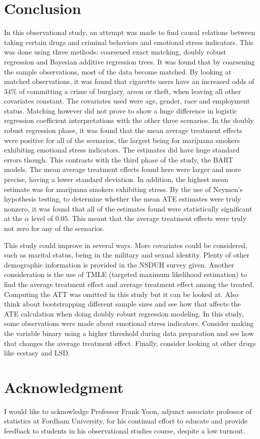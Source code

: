 \documentclass[a4paper, 10pt, conference]{ieeeconf}
\begin{document}
\section{Conclusion}

In this observational study, an attempt was made to find causal relations between taking certain drugs and criminal behaviors and emotional stress indicators. This was done using three methods: coarsened exact matching, doubly robust regression and Bayesian additive regression trees. It was found that by coarsening the sample observations, most of the data become matched. By looking at matched observations, it was found that cigarette users have an increased odds of $34\%$ of committing a crime of burglary, arson or theft, when leaving all other covariates constant. The covariates used were age, gender, race and employment status. Matching however did not prove to show a huge difference in logistic regression coefficient interpretations with the other three scenarios. In the doubly robust regression phase, it was found that the mean average treatment effects were positive for all of the scenarios, the largest being for marijuana smokers exhibiting emotional stress indicators. The estimates did have huge standard errors though. This contrasts with the third phase of the study, the BART models. The mean average treatment effects found here were larger and more precise, having a lower standard deviation. In addition, the highest mean estimate was for marijuana smokers exhibiting stress. By the use of Neymen's hypothesis testing, to determine whether the mean ATE estimates were truly nonzero, it was found that all of the estimates found were statistically significant at the $\alpha$ level of $0.05$. This meant that the average treatment effects were truly not zero for any of the scenarios. 

This study could improve in several ways. More covariates could be considered, such as marital status, being in the military and sexual identity. Plenty of other demographic information is provided in the NSDUH survey given. Another consideration is the use of TMLE (targeted maximum likelihood estimation) to find the average treatment effect and average treatment effect among the treated. Computing the ATT was omitted in this study but it can be looked at. Also think about bootstrapping different sample sizes and see how that affects the ATE calculation when doing doubly robust regression modeling. In this study, some observations were made about emotional stress indicators. Consider making the variable binary using a higher threshold during data preparation and see how that changes the average treatment effect. Finally, consider looking at other drugs like ecstasy and LSD. 

\section*{Acknowledgment}

I would like to acknowledge Professor Frank Yoon, adjunct associate professor of statistics at Fordham University, for his continual effort to educate and provide feedback to students in his observational studies course, despite a low turnout.
\end{document}
